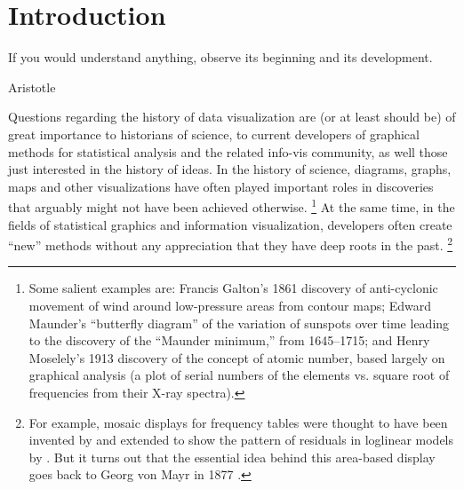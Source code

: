 \section{Introduction}\label{sec:intro}
\epigraph{If you would understand anything, observe its beginning and its 
development.}{Aristotle}

Questions regarding the history of data visualization are (or at least should 
be) of great importance to historians of science, to current developers of 
graphical methods for statistical analysis and the related info-vis community, 
as well those just interested in the history of ideas.
In the history of science, diagrams, graphs, maps and other visualizations have 
often played important roles in discoveries that arguably might not have been 
achieved otherwise.%
\footnote{
	Some salient examples are:
	Francis Galton's 1861 discovery of anti-cyclonic movement of wind 
    around low-pressure areas from contour maps; Edward Maunder's ``butterfly 
    diagram'' of the variation of sunspots over time leading to the	discovery of 
    the ``Maunder minimum,'' from 1645--1715; and Henry Moselely's 1913 discovery 
    of the concept of atomic number, based largely on graphical analysis (a plot of 
    serial numbers of the elements vs. square root of frequencies from their X-ray 
    spectra).
}
At the same time, in the fields of statistical graphics and information 
visualization, developers often create ``new'' methods without any appreciation 
that they have deep roots in the past.%
\footnote{
  For example, mosaic displays for frequency tables were thought to have been 
  invented by \citet{HartiganKleiner:81} and extended to show the pattern of 
  residuals in loglinear models by \citet{Friendly:94a}.
  But it turns out that the essential idea behind this area-based display  goes 
  back to Georg von Mayr in 1877 \citep{Friendly:2002:mosahist}.
}

